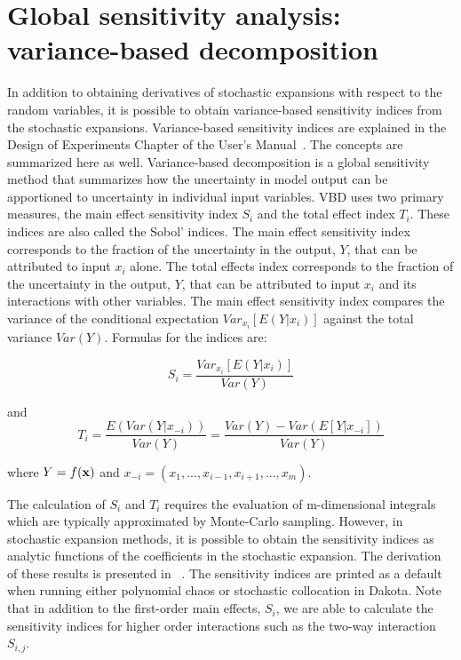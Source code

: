 \section{Global sensitivity analysis: variance-based decomposition}\label{uq:expansion:vbd}

In addition to obtaining derivatives of stochastic expansions with
respect to the random variables, it is possible to obtain
variance-based sensitivity indices from the stochastic expansions.
Variance-based sensitivity indices are explained in the Design of
Experiments Chapter of the User's Manual~\cite{UsersMan}.  The concepts
are summarized here as well.  Variance-based decomposition is a global
sensitivity method that summarizes how the uncertainty in model output
can be apportioned to uncertainty in individual input variables.  VBD
uses two primary measures, the main effect sensitivity index $S_{i}$
and the total effect index $T_{i}$.  These indices are also called the
Sobol' indices. The main effect sensitivity index corresponds to the
fraction of the uncertainty in the output, $Y$, that can be attributed
to input $x_{i}$ alone.  The total effects index corresponds to the
fraction of the uncertainty in the output, $Y$, that can be attributed
to input $x_{i}$ and its interactions with other variables. The main
effect sensitivity index compares the variance of the conditional
expectation $Var_{x_{i}}[E(Y|x_{i})]$ against the total variance
$Var(Y)$.  Formulas for the indices are:

\begin{equation}
S_{i}=\frac{Var_{x_{i}}[E(Y|x_{i})]}{Var(Y)} \label{eq:sobol}
\end{equation}

and 
\begin{equation}
T_{i}=\frac{E(Var(Y|x_{-i}))}{Var(Y)}=\frac{Var(Y)-Var(E[Y|x_{-i}])}{Var(Y)}
\label{eq:total_sobol}
\end{equation}

where $Y=f({\bf x})$ and ${x_{-i}=(x_{1},...,x_{i-1},x_{i+1},...,x_{m})}$.

The calculation of $S_{i}$ and $T_{i}$ requires the evaluation of 
m-dimensional integrals which are typically approximated by Monte-Carlo 
sampling. However, in stochastic expansion methods, it is possible to 
obtain the sensitivity indices as analytic functions of the 
coefficients in the stochastic expansion.  The derivation 
of these results is presented in ~\cite{Tang10b}. The sensitivity 
indices are printed as a default when running either 
polynomial chaos or stochastic collocation in Dakota. 
Note that in addition to the first-order main effects, $S_{i}$, 
we are able to calculate the sensitivity indices for higher order 
interactions such as the two-way interaction  $S_{i,j}$.   

